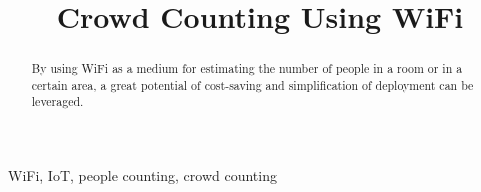 \documentclass[conference]{IEEEtran}
\begin{document}
\title{Crowd Counting Using WiFi\\
}

\author{

}

\maketitle

\begin{abstract}
By using WiFi as a medium for estimating the number of people in a room or in a certain area, a great potential of cost-saving and simplification of deployment can be leveraged.
\vspace{80mm}
\end{abstract}

\begin{IEEEkeywords}
WiFi, IoT, people counting, crowd counting
\end{IEEEkeywords}
\end{document}
